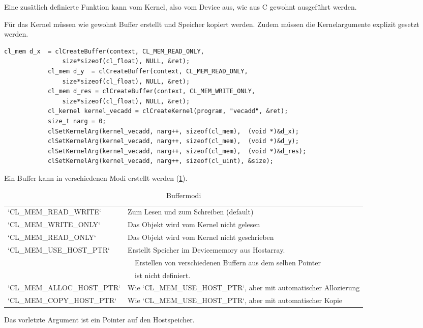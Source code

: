 			Eine zusätlich definierte Funktion kann vom \Gls{Kernel}, also vom Device aus, wie aus C gewohnt ausgeführt werden. 
			
			Für das \Gls{Kernel} müssen wie gewohnt Buffer erstellt und Speicher kopiert werden. Zudem müssen die Kernelargumente explizit gesetzt werden.
			\begin{lstlisting}[caption=Kernelaufruf]
			cl_mem d_x  = clCreateBuffer(context, CL_MEM_READ_ONLY, 
				size*sizeof(cl_float), NULL, &ret);
			cl_mem d_y  = clCreateBuffer(context, CL_MEM_READ_ONLY, 
				size*sizeof(cl_float), NULL, &ret);
			cl_mem d_res = clCreateBuffer(context, CL_MEM_WRITE_ONLY, 
				size*sizeof(cl_float), NULL, &ret);
			cl_kernel kernel_vecadd = clCreateKernel(program, "vecadd", &ret);	
			size_t narg = 0;
			clSetKernelArg(kernel_vecadd, narg++, sizeof(cl_mem),  (void *)&d_x);
			clSetKernelArg(kernel_vecadd, narg++, sizeof(cl_mem),  (void *)&d_y);
			clSetKernelArg(kernel_vecadd, narg++, sizeof(cl_mem),  (void *)&d_res);
			clSetKernelArg(kernel_vecadd, narg++, sizeof(cl_uint), &size);
			\end{lstlisting}
			
			Ein Buffer kann in verschiedenen Modi erstellt werden (\ref{tab4:flags}).
			\begin{table}[h]
				\centering
				\begin{tabular}{|l|l|}\hline
				\li`CL_MEM_READ_WRITE` & Zum Lesen und zum Schreiben (default) \\
				\li`CL_MEM_WRITE_ONLY` & Das Objekt wird vom \Gls{Kernel} nicht gelesen \\	
				\li`CL_MEM_READ_ONLY`  & Das Objekt wird vom \Gls{Kernel} nicht geschrieben \\
				\li`CL_MEM_USE_HOST_PTR` & Erstellt Speicher im Devicememory aus Hostarray.\\
				                         & ~~Erstellen von verschiedenen Buffern aus dem selben Pointer\\
				                         & ~~ist nicht definiert.\\
				\li`CL_MEM_ALLOC_HOST_PTR` & Wie \li`CL_MEM_USE_HOST_PTR`, aber mit automatischer Allozierung \\
				\li`CL_MEM_COPY_HOST_PTR`  & Wie \li`CL_MEM_USE_HOST_PTR`, aber mit automatischer Kopie\\ \hline
				\end{tabular}
				\caption{Buffermodi}
				\label{tab4:flags}
			\end{table}
			
			Das vorletzte Argument ist ein Pointer auf den Hostspeicher.
			
